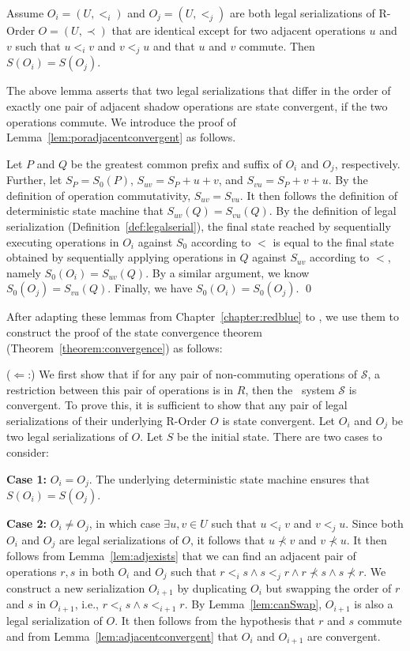 \begin{lemma}\label{lem:poradjacentconvergent}
Assume $O_i=(U,<_i)$ and $O_j=(U,<_j)$ are both legal
serializations of R-Order $O=(U,\prec)$ that are identical except for
two adjacent operations $u$ and $v$ such that $u<_iv$ and $v<_ju$ and that $u$ and $v$ commute. Then
$S(O_i)=S(O_j)$.
\end{lemma}

The above lemma asserts that two legal serializations that differ
in the order of exactly one pair of adjacent shadow operations are state 
convergent, if the two operations commute. We introduce the proof 
of Lemma~\ref{lem:poradjacentconvergent} as follows.

 Let $P$ and $Q$ be the greatest common prefix and suffix
of $O_i$ and $O_j$, respectively.  Further, let $S_P=S_0(P)$,
$S_{uv}=S_P+u+v$, and $S_{vu}=S_P+v+u$. By the definition of operation commutativity,
$S_{uv} = S_{vu}$. It then follows the definition
of deterministic state machine that $S_{uv}(Q) = S_{vu}(Q)$. 
By the definition of legal serialization (Definition~\ref{def:legalserial}),
the final state reached by sequentially executing operations in $O_{i}$ 
against $S_0$ according to $<$ is equal to the final state obtained by 
sequentially applying operations in $Q$ against $S_{uv}$ according to $<$, namely $S_0(O_i)=S_{uv}(Q)$. By a
similar argument, we know $S_0(O_j)=S_{vu}(Q)$. Finally, we have $S_0(O_i)=S_0(O_j)$.
\qed

After adapting these lemmas from Chapter~\ref{chapter:redblue} to \PRCN, we use
them to construct the proof of the state convergence theorem (Theorem~\ref{theorem:convergence}) as follows:

($\Leftarrow$:) We first show that if for any pair of non-commuting operations of $\mathscr{S}$,
a restriction between this pair of operations is in $R$, then the \PRCAJ\ system $\mathscr{S}$ is convergent. 
To prove this, it is sufficient to show that any pair of legal serializations of their underlying R-Order $O$ 
is state convergent. Let $O_{i}$ and $O_{j}$ be two legal serializations of $O$. Let $S$ be the initial state.
There are two cases to consider:

{\bf Case 1:} $O_i = O_j$.  The underlying deterministic state
machine ensures that $S(O_i)=S(O_j)$.

{\bf Case 2:} $O_i \neq O_j$, in which case $\exists u,v\in U$
such that $u<_i v$ and $v<_j u$. Since both $O_i$ and $O_j$ are
legal serializations of $O$, it follows that $u\not\prec v$ and
$v\not\prec u$. It then follows from Lemma~\ref{lem:adjexists} that we
can find an adjacent pair of operations $r, s$ in both $O_i$ and $O_j$ such
that $r<_i s \wedge s<_j r \wedge r\not\prec s \wedge s\not\prec r$. 
We construct a new serialization $O_{i+1}$ by duplicating $O_i$ but swapping the 
order of $r$ and $s$ in $O_{i+1}$, i.e., $r<_i s \wedge s<_{i+1} r$. By Lemma~\ref{lem:canSwap}, 
$O_{i+1}$ is also a legal serialization of $O$. It then follows from the hypothesis that $r$ and $s$
commute and from Lemma~\ref{lem:adjacentconvergent} that $O_i$ and $O_{i+1}$ are convergent.

